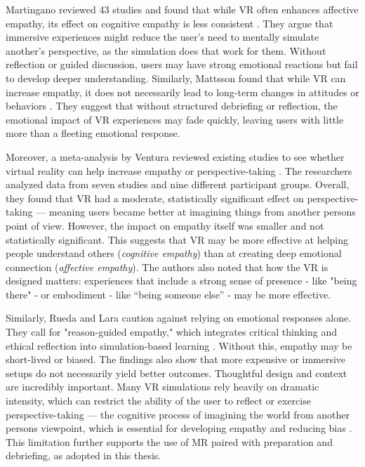 Martingano \cite{Martingano2021} reviewed 43 studies and found that while VR often enhances affective empathy, its effect on cognitive empathy is less consistent \cite{Martingano2021}. They argue that immersive experiences might reduce the user's need to mentally simulate another's perspective, as the simulation does that work for them. Without reflection or guided discussion, users may have strong emotional reactions but fail to develop deeper understanding. Similarly, Mattsson \cite{Mattsson2024} found that while VR can increase empathy, it does not necessarily lead to long-term changes in attitudes or behaviors \cite{Mattsson2024}. They suggest that without structured debriefing or reflection, the emotional impact of VR experiences may fade quickly, leaving users with little more than a fleeting emotional response.

\vspace{1em}

Moreover,  a meta-analysis by Ventura \cite{Ventura2020} reviewed existing studies to see whether virtual reality can help increase empathy or perspective-taking \cite{Ventura2020}. The researchers analyzed data from seven studies and nine different participant groups. Overall, they found that VR had a moderate, statistically significant effect on perspective-taking — meaning users became better at imagining things from another persons point of view. However, the impact on empathy itself was smaller and not statistically significant. This suggests that VR may be more effective at helping people understand others (\textit{cognitive empathy}) than at creating deep emotional connection (\textit{affective empathy}). The authors also noted that how the VR is designed matters: experiences that include a strong sense of presence - like "being there" - or embodiment - like “being someone else” - may be more effective. 

\vspace{1em}

Similarly, Rueda and Lara \cite{Rueda2020} caution against relying on emotional responses alone. They call for "reason-guided empathy," which integrates critical thinking and ethical reflection into simulation-based learning \cite{Rueda2020}. Without this, empathy may be short-lived or biased. The findings also show that more expensive or immersive setups do not necessarily yield better outcomes. Thoughtful design and context are incredibly important. Many VR simulations rely heavily on dramatic intensity, which can restrict the ability of the user to reflect or exercise perspective-taking — the cognitive process of imagining the world from another persons viewpoint, which is essential for developing empathy and reducing bias \cite{Mattsson2024}. This limitation further supports the use of MR paired with preparation and debriefing, as adopted in this thesis.

